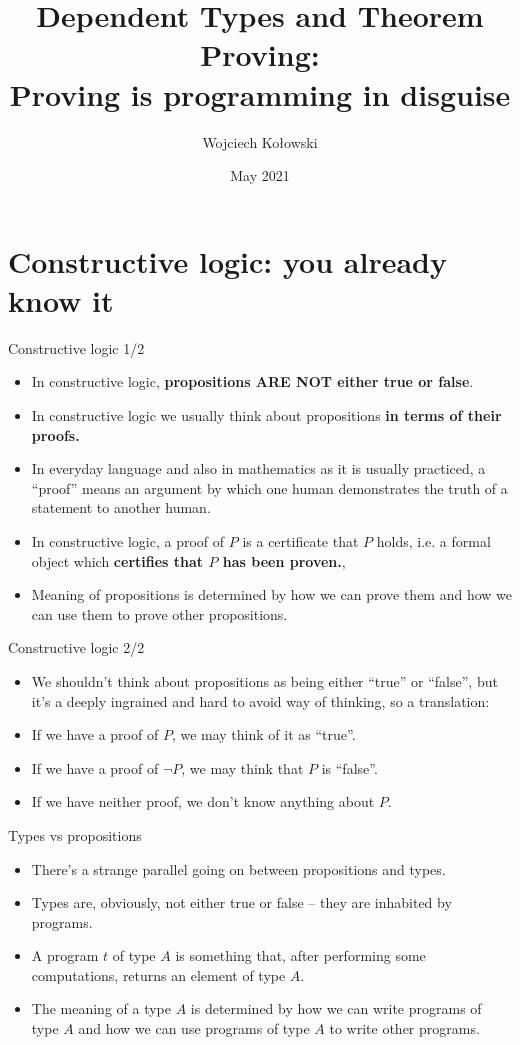 \documentclass{beamer}
\title{Dependent Types and Theorem Proving: \\Proving is programming in disguise}
\author{Wojciech Kołowski}
\date{May 2021}
\begin{document}
\section{Constructive logic: you already know it}

\begin{frame}{Constructive logic 1/2}
\begin{itemize}
	\item In constructive logic, \textbf{propositions ARE NOT either true or false}.
	\item In constructive logic we usually think about propositions \textbf{in terms of their proofs.}
	\item In everyday language and also in mathematics as it is usually practiced, a ``proof'' means an argument by which one human demonstrates the truth of a statement to another human.
	\item In constructive logic, a proof of $P$ is a certificate that $P$ holds, i.e. a formal object which \textbf{certifies that $P$ has been proven.},
	\item Meaning of propositions is determined by how we can prove them and how we can use them to prove other propositions.
\end{itemize}
\end{frame}

\begin{frame}{Constructive logic 2/2}
\begin{itemize}
	\item We shouldn't think about propositions as being either ``true'' or ``false'', but it's a deeply ingrained and hard to avoid way of thinking, so a translation:
	\item If we have a proof of $P$, we may think of it as ``true''.
	\item If we have a proof of $\neg P$, we may think that $P$ is ``false''.
	\item If we have neither proof, we don't know anything about $P$.
\end{itemize}
\end{frame}

\begin{frame}{Types vs propositions}
\begin{itemize}
	\item There's a strange parallel going on between propositions and types.
	\item Types are, obviously, not either true or false -- they are inhabited by programs.
	\item A program $t$ of type $A$ is something that, after performing some computations, returns an element of type $A$.
	\item The meaning of a type $A$ is determined by how we can write programs of type $A$ and how we can use programs of type $A$ to write other programs.
\end{itemize}
\end{frame}
\end{document}
